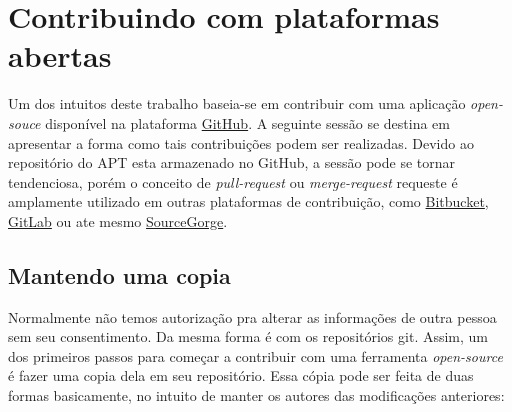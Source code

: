 \section{Contribuindo com plataformas abertas} %
\label{sec:contribuindo_com_plataformas_abertas}

Um dos intuitos deste trabalho baseia-se em contribuir com uma aplicação \textit{open-souce} disponível na plataforma \href{GitHub.com}{GitHub}. A seguinte sessão se destina em apresentar a forma como tais contribuições podem ser realizadas. Devido ao repositório do APT esta armazenado no GitHub, a sessão pode se tornar tendenciosa, porém o conceito de \textit{pull-request} ou  \textit{merge-request} requeste é amplamente utilizado em outras plataformas de contribuição, como \href{https://bitbucket.org/}{Bitbucket}, \href{https://gitlab.com/}{GitLab} ou ate mesmo \href{http://sourceforge.net/}{SourceGorge}.


\subsection*{Mantendo uma copia} %
\label{sub:mantendo_uma_copia_sua}


Normalmente não temos autorização pra alterar as informações de outra pessoa sem seu consentimento. Da mesma forma  é com os repositórios {\code git}. Assim, um dos primeiros passos para começar a contribuir com uma ferramenta \textit{open-source} é fazer uma copia dela em seu repositório. Essa cópia pode ser feita de duas formas basicamente, no intuito de manter os autores das modificações anteriores:

